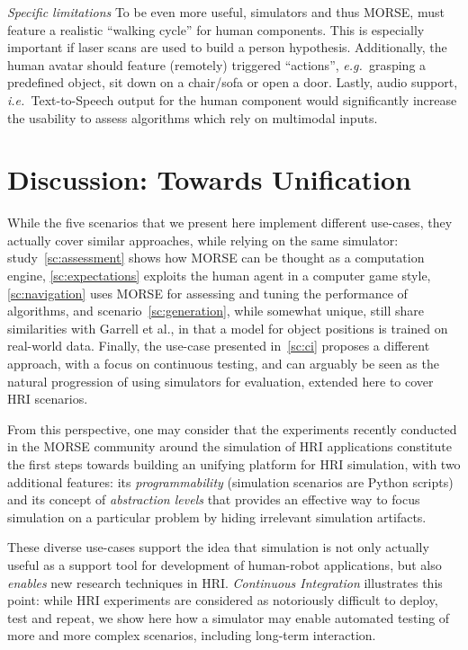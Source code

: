 \documentclass{llncs}
\newcommand{\eg}{{\textit{e.g.~}}}
\newcommand{\ie}{{\textit{i.e.~}}}
\begin{document}
\emph{Specific limitations} To be even more useful, simulators and thus MORSE, must
feature a realistic ``walking cycle'' for human components. This is especially
important if laser scans are used to build a person hypothesis. Additionally, the
human avatar should feature (remotely) triggered ``actions'', \eg grasping a 
predefined object, sit down on a chair/sofa or open a door. Lastly, audio support, 
\ie Text-to-Speech output for the human component would significantly increase
the usability to assess algorithms which rely on multimodal inputs.  

\section{Discussion: Towards Unification}

While the five scenarios that we present here implement different use-cases,
they actually cover similar approaches, while relying on the same simulator:
study~\ref{sc:assessment} shows how MORSE can be thought as a computation
engine, \ref{sc:expectations} exploits the human agent in a computer game style,
\ref{sc:navigation} uses MORSE for assessing and tuning the performance of
algorithms, and scenario~\ref{sc:generation}, while somewhat unique, still share
similarities with Garrell et al., in that a model for object positions is
trained on real-world data. Finally, the use-case presented in~\ref{sc:ci}
proposes a different approach, with a focus on continuous testing, and can
arguably be seen as the natural progression of using simulators for evaluation,
extended here to cover HRI scenarios.

From this perspective, one may consider that the experiments recently conducted
in the MORSE community around the simulation of HRI applications constitute the
first steps towards building an unifying platform for HRI simulation, with two
additional features: its \emph{programmability} (simulation scenarios are Python
scripts) and its concept of \emph{abstraction levels} that provides an effective
way to focus simulation on a particular problem by hiding irrelevant simulation
artifacts.

These diverse use-cases support the idea that simulation is not only actually
useful as a support tool for development of human-robot applications, but also
\emph{enables} new research techniques in HRI. \emph{Continuous Integration}
illustrates this point: while HRI experiments are considered as notoriously
difficult to deploy, test and repeat, we show here how a simulator may enable
automated testing of more and more complex scenarios, including long-term
interaction.
\end{document}

